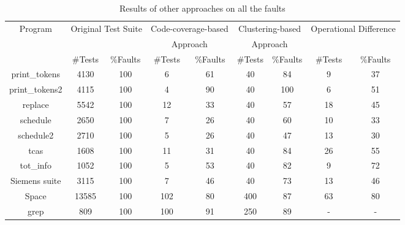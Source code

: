 \documentclass{sig-alternate}
\begin{document}
\begin{table}[htbp]
\caption{Results of other approaches on all the
faults}\label{tab:other} \center
\begin{tabular}{|c|c|c|c|c|c|c|c|c|}

\hline Program   & \multicolumn{2}{c}{Original Test Suite} \vline &
\multicolumn{2}{c}{Code-coverage-based} \vline &
\multicolumn{2}{c}{Clustering-based} \vline &
\multicolumn{2}{c}{Operational Difference} \vline
    \\

& \multicolumn{2}{c}{} \vline & \multicolumn{2}{c}{Approach} \vline
& \multicolumn{2}{c}{Approach} \vline & \multicolumn{2}{c}{} \vline
   \\

 \cline{2-9}  & \#Tests &   \%Faults & \#Tests &   \%Faults &
\#Tests &   \%Faults & \#Tests &   \%Faults  \\


\hline  print\_tokens   &   4130    &   100 &   6   &   61  &   40  &   84  &   9   &   37   \\
\hline  print\_tokens2  &   4115    &   100 &   4   &   90  &   40  &   100 &   6   &   51    \\
\hline  replace &   5542    &   100 &   12  &   33  &   40  &   57  &   18  &   45    \\
\hline  schedule    &   2650    &   100 &   7   &   26  &   40  &   60  &   10  &   33   \\
\hline  schedule2   &   2710    &   100 &   5   &   26  &   40  &   47  &   13  &   30    \\
\hline  tcas    &   1608    &   100 &   11  &   31  &   40  &   84  &   26  &   55    \\
\hline  tot\_info &   1052    &   100 &   5   &   53  &   40  &   82  &   9   &   72   \\
\hline  Siemens suite   &   3115    &   100 &   7   &   46  &   40  &   73  &   13  &   46   \\
\hline  Space   &   13585   &   100 &   102 &   80  &   400 &   87  &   63  &   80  \\
\hline  grep    &   809 &   100 &   100 &   91  &   250 &   89  &   -   &   -     \\

\hline
\end{tabular}
\end{table}
\end{document}
